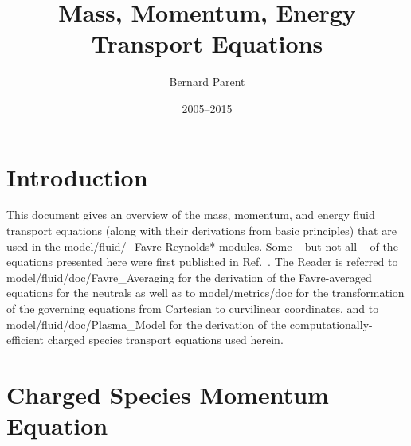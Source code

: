 \documentclass{warpdoc}
\author{
  Bernard Parent
}
\title{
  Mass, Momentum, Energy Transport Equations
}
\date{
  2005--2015
}
\begin{document}
  \pagestyle{headings}
  \setcounter{page}{1}
  \makewarpdoctitle
  \tableofcontents
  \makenomenclature


\section{Introduction}

This document gives an overview of the mass, momentum, and energy fluid transport equations (along with their derivations from basic principles) that are used in the model/fluid/_Favre-Reynolds* modules. Some -- but not all -- of the equations presented here were first published in Ref.\ \cite{aiaa:2016:parent}. The Reader is referred to  model/fluid/doc/Favre_Averaging for the derivation of the Favre-averaged equations for the neutrals as well as to model/metrics/doc for the transformation of the governing equations from Cartesian to curvilinear coordinates, and to model/fluid/doc/Plasma_Model for the derivation of the computationally-efficient charged species transport equations used herein.



\section{Charged Species Momentum Equation}
\end{document}

